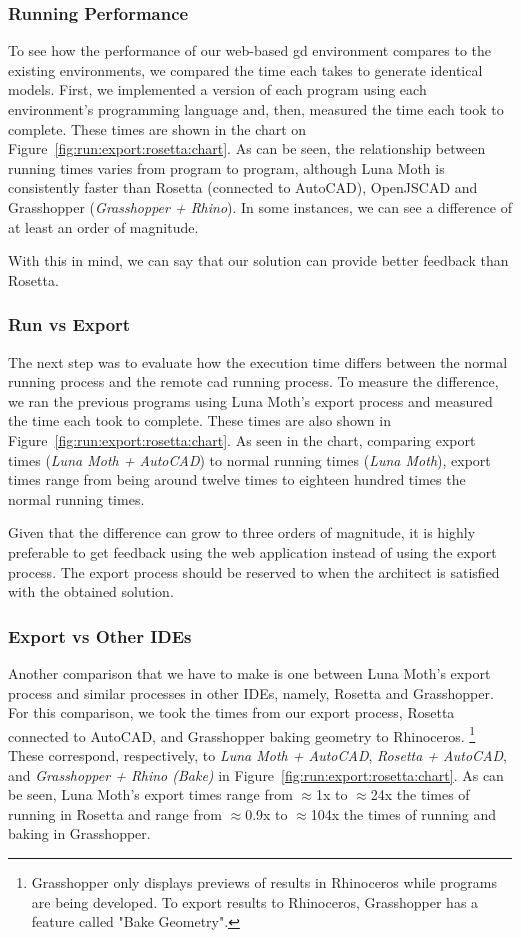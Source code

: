 \subsubsection{Running Performance}
To see how the performance of our web-based \gls{gd} environment compares to the existing environments, we compared the time each takes to generate identical models.
First, we implemented a version of each program using each environment's programming language and, then, measured the time each took to complete.
These times are shown in the chart on Figure~\ref{fig:run:export:rosetta:chart}.
As can be seen, the relationship between running times varies from program to program, although Luna Moth is consistently faster than Rosetta (connected to AutoCAD), OpenJSCAD and Grasshopper (\textit{Grasshopper + Rhino}).
In some instances, we can see a difference of at least an order of magnitude.

With this in mind, we can say that our solution can provide better feedback than Rosetta.


\subsubsection{Run vs Export}
The next step was to evaluate how the execution time differs between the normal running process and the remote \gls{cad} running process.
To measure the difference, we ran the previous programs using Luna Moth's export process and measured the time each took to complete.
These times are also shown in Figure~\ref{fig:run:export:rosetta:chart}.
As seen in the chart, comparing export times (\textit{Luna Moth + AutoCAD}) to normal running times (\textit{Luna Moth}), export times range from being around twelve times to eighteen hundred times the normal running times.

Given that the difference can grow to three orders of magnitude, it is highly preferable to get feedback using the web application instead of using the export process.
The export process should be reserved to when the architect is satisfied with the obtained solution.


\subsubsection{Export vs Other IDEs}
Another comparison that we have to make is one between Luna Moth's export process and similar processes in other IDEs, namely, Rosetta and Grasshopper.
For this comparison, we took the times from our export process, Rosetta connected to AutoCAD, and Grasshopper baking geometry to Rhinoceros.%
\footnote{Grasshopper only displays previews of results in Rhinoceros while programs are being developed. To export results to Rhinoceros, Grasshopper has a feature called "Bake Geometry".}
These correspond, respectively, to \textit{Luna Moth + AutoCAD}, \textit{Rosetta + AutoCAD}, and \textit{Grasshopper + Rhino (Bake)} in Figure~\ref{fig:run:export:rosetta:chart}.
As can be seen, Luna Moth's export times range from $\approx$1x to $\approx$24x the times of running in Rosetta and range from $\approx$0.9x to $\approx$104x the times of running and baking in Grasshopper.


